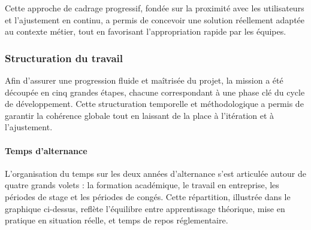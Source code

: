\documentclass[11pt,a4paper]{article}
\begin{document}
\noindent Cette approche de cadrage progressif, fondée sur la proximité avec les utilisateurs et l’ajustement en continu, a permis de concevoir une solution réellement adaptée au contexte métier, tout en favorisant l’appropriation rapide par les équipes.

\newpage
\subsubsection{Structuration du travail}

Afin d’assurer une progression fluide et maîtrisée du projet, la mission a été découpée en cinq grandes étapes, chacune correspondant à une phase clé du cycle de développement. Cette structuration temporelle et méthodologique a permis de garantir la cohérence globale tout en laissant de la place à l’itération et à l’ajustement.


\paragraph{Temps d'alternance} 

L’organisation du temps sur les deux années d’alternance s’est articulée autour de quatre grands volets : la formation académique, le travail en entreprise, les périodes de stage et les périodes de congés. Cette répartition, illustrée dans le graphique ci-dessus, reflète l’équilibre entre apprentissage théorique, mise en pratique en situation réelle, et temps de repos réglementaire.
\end{document}
